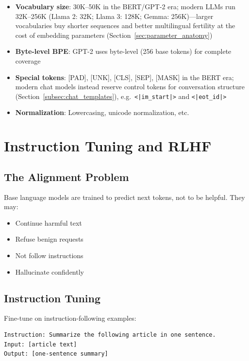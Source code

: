 \begin{itemize}
    \item \textbf{Vocabulary size}: 30K--50K in the BERT/GPT-2 era; modern LLMs run 32K--256K (Llama 2: 32K; Llama 3: 128K; Gemma: 256K)---larger vocabularies buy shorter sequences and better multilingual fertility at the cost of embedding parameters (Section~\ref{sec:parameter_anatomy})
    \item \textbf{Byte-level BPE}: GPT-2 uses byte-level (256 base tokens) for complete coverage
    \item \textbf{Special tokens}: [PAD], [UNK], [CLS], [SEP], [MASK] in the BERT era; modern chat models instead reserve control tokens for conversation structure (Section~\ref{subsec:chat_templates}), e.g.\ \verb+<|im_start|>+ and \verb+<|eot_id|>+
    \item \textbf{Normalization}: Lowercasing, unicode normalization, etc.
\end{itemize}

\section{Instruction Tuning and RLHF}
\label{sec:instruction_tuning}

\subsection{The Alignment Problem}

Base language models are trained to predict next tokens, not to be helpful. They may:
\begin{itemize}
    \item Continue harmful text
    \item Refuse benign requests
    \item Not follow instructions
    \item Hallucinate confidently
\end{itemize}

\subsection{Instruction Tuning}

Fine-tune on instruction-following examples:
\begin{verbatim}
Instruction: Summarize the following article in one sentence.
Input: [article text]
Output: [one-sentence summary]
\end{verbatim}


